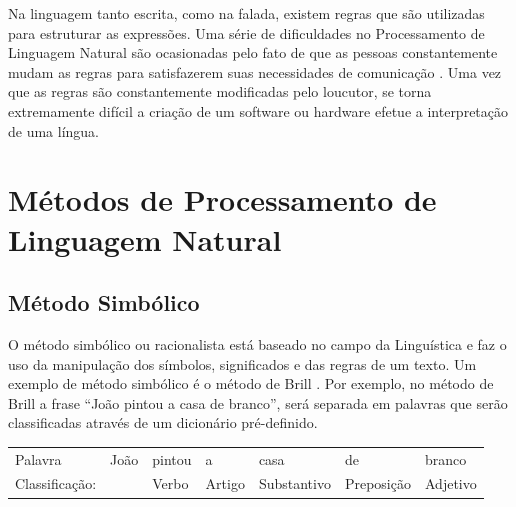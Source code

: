 Na linguagem tanto escrita, como na falada, existem regras que são utilizadas
para estruturar as expressões. Uma série de dificuldades no Processamento de
Linguagem Natural são ocasionadas pelo fato de que as pessoas constantemente
mudam as regras para satisfazerem suas necessidades de comunicação \cite{manningschutze1999}. Uma vez que as regras são
constantemente modificadas pelo loucutor, se torna extremamente difícil a criação de um software ou hardware efetue a interpretação de uma língua. 

% 
% 
% 

\section{Métodos de Processamento de Linguagem Natural}

\subsection{Método Simbólico} 
O método simbólico ou racionalista está
baseado no campo da Linguística e faz o uso da manipulação dos símbolos,
significados e das regras de um texto. Um exemplo de método simbólico é o
método de Brill \cite{Brill:1992:SRP:974499.974526}. Por exemplo, no método de
Brill a frase ``João pintou a casa de branco'', será separada em palavras que serão classificadas através de um dicionário pré-definido.

\begin{table}[htb]
\centering
\begin{tabular}{l|l|l|l|l|l|l}
Palavra         & João        & pintou & a      & casa        & de        
& branco
         \\
Classificação:   & 			   & Verbo  & Artigo & Substantivo & Preposição & Adjetivo
\end{tabular}
\label{my-label}
\end{table}

